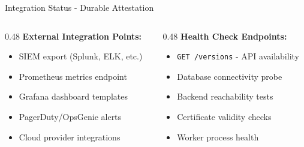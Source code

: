 \begin{frame}{Integration Status - Durable Attestation}
  \begin{columns}[T]
    \begin{column}{0.48\textwidth}
      \textbf{External Integration Points:}
      \begin{itemize}
        \item SIEM export (Splunk, ELK, etc.)
        \item Prometheus metrics endpoint
        \item Grafana dashboard templates
        \item PagerDuty/OpsGenie alerts
        \item Cloud provider integrations
      \end{itemize}
    \end{column}
    \begin{column}{0.48\textwidth}
      \textbf{Health Check Endpoints:}
      \begin{itemize}
        \item \texttt{GET /versions} - API availability
        \item Database connectivity probe
        \item Backend reachability tests
        \item Certificate validity checks
        \item Worker process health
      \end{itemize}
    \end{column}
  \end{columns}
\end{frame}
